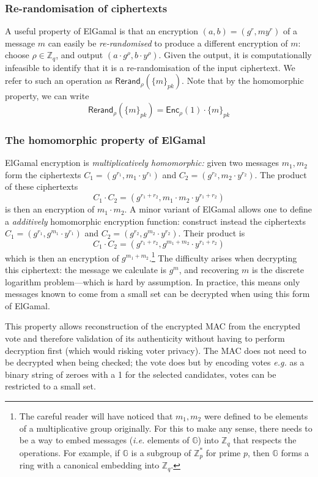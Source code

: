 \documentclass[12pt,a4paper]{article}
\theoremstyle{definition}
\newcommand{\ie}{\textit{i.e. }}
\newcommand{\eg}{\textit{e.g. }}
\begin{document}
\subsubsection{Re-randomisation of ciphertexts}
A useful property of ElGamal is that an encryption $(a, b)=(g^r, my^r)$ of a message $m$ can easily be \textit{re-randomised} to produce a different encryption of $m$: choose $\rho\in\mathbb{Z}_q$, and output $(a\cdot g^\rho, b\cdot y^\rho)$. Given the output, it is computationally infeasible to identify that it is a re-randomisation of the input ciphertext. We refer to such an operation as $\mathsf{Rerand}_\rho(\{m\}_{pk})$. Note that by the homomorphic property, we can write
$$\mathsf{Rerand}_\rho(\{m\}_{pk})=\mathsf{Enc}_{\rho}(1)\cdot\{m\}_{pk}$$

\subsubsection{The homomorphic property of ElGamal}
ElGamal encryption is \textit{multiplicatively homomorphic:} given two messages $m_1, m_2$ form the ciphertexts $C_1 = (g^{r_1}, m_1\cdot y^{r_1})$ and $C_2 = (g^{r_2}, m_2\cdot y^{r_2})$. The product of these ciphertexts
$$C_1\cdot C_2 = (g^{r_1+r_2}, m_1\cdot m_2\cdot y^{r_1+r_2})$$
is then an encryption of $m_1\cdot m_2$. A minor variant of ElGamal allows one to define a \textit{additively} homomorphic encryption function: construct instead the ciphertexts $C_1 = (g^{r_1}, g^{m_1}\cdot y^{r_1})$ and $C_2 = (g^{r_2}, g^{m_2}\cdot y^{r_2})$. Their product is
$$C_1\cdot C_2 = (g^{r_1+r_2}, g^{m_1 + m_2}\cdot y^{r_1+r_2})$$
which is then an encryption of $g^{m_1 + m_2}$.\footnote{The careful reader will have noticed that $m_1, m_2$ were defined to be elements of a multiplicative group originally. For this to make any sense, there needs to be a way to embed messages (\ie elements of $\mathbb{G}$) into $\mathbb{Z}_q$ that respects the operations. For example, if $\mathbb{G}$ is a subgroup of $\mathbb{Z}^*_p$ for prime $p$, then $\mathbb{G}$ forms a ring with a canonical embedding into $\mathbb{Z}_q$.} The difficulty arises when decrypting this ciphertext: the message we calculate is $g^m$, and recovering $m$ is the discrete logarithm problem---which is hard by assumption. In practice, this means only messages known to come from a small set can be decrypted when using this form of ElGamal.

This property allows reconstruction of the encrypted MAC from the encrypted vote and therefore validation of its authenticity without having to perform decryption first (which would risking voter privacy). The MAC does not need to be decrypted when being checked; the vote does but by encoding votes \eg as a binary string of zeroes with a 1 for the selected candidates, votes can be restricted to a small set.
\end{document}
